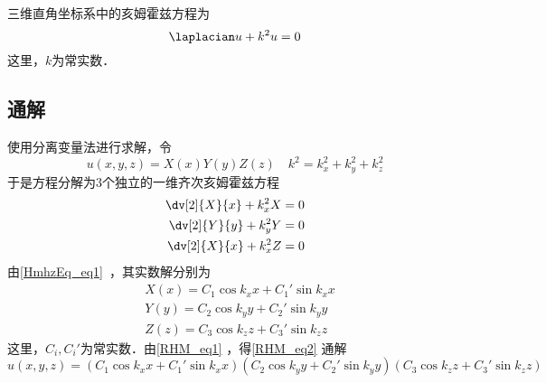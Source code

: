 三维直角坐标系中的亥姆霍兹方程为
\begin{equation}\label{RHM_eq2}
\laplacian u+k^2u=0
\end{equation}
这里，$k$为常实数．
\subsection{通解}
使用分离变量法进行求解，令
\begin{equation}\label{RHM_eq1}
u(x,y,z)=X(x)Y(y)Z(z)\quad
k^2=k_x^2+k_y^2+k_z^2
\end{equation}
于是方程分解为3个独立的一维齐次亥姆霍兹方程
\begin{equation}
\begin{aligned}
\dv[2]{X}{x}+k_x^2X=0\\
\dv[2]{Y}{y}+k_y^2Y=0\\
\dv[2]{X}{x}+k_x^2Z=0
\end{aligned}
\end{equation}
由\autoref{HmhzEq_eq1}~，其实数解分别为
\begin{equation}
\begin{aligned}
&X(x)=C_1\cos k_xx+C_1'\sin k_xx\\
&Y(y)=C_2\cos k_yy+C_2'\sin k_yy\\
&Z(z)=C_3\cos k_zz+C_3'\sin k_zz
\end{aligned}
\end{equation}
这里，$C_i,C_i'$为常实数．由\autoref{RHM_eq1} ，得\autoref{RHM_eq2} 通解
\begin{equation}\label{RHM_eq3}
u(x,y,z)=(C_1\cos k_xx+C_1'\sin k_xx)(C_2\cos k_yy+C_2'\sin k_yy)(C_3\cos k_zz+C_3'\sin k_zz)
\end{equation}
